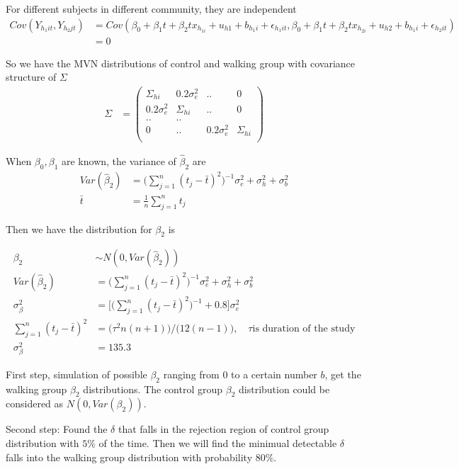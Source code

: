 \begin{itemize}
For different subjects in different community, they are independent
\begin{align*}
Cov(Y_{h_1it}, Y_{h_2jt})  &=Cov( \beta_0 + \beta_1t + \beta_2 t x_{h_{1i}} + u_{h1} + b_{h_1i} + \epsilon_{h_1it},  \beta_0 + \beta_1t + \beta_2 t x_{h_{2i}} + u_{h2} + b_{h_1i} + \epsilon_{h_2it})  \\ 
&=0 
\end{align*}

So we have the MVN distributions of control and walking group with covariance structure of $\Sigma$
\begin{align*}
\Sigma &= \begin{pmatrix} 
\Sigma_{hi} &  0.2 \sigma_e^2 &.. & 0 \\
 0.2 \sigma_e^2 &\Sigma_{hi} &..& 0 \\
..&..\\
 0 &.. & 0.2 \sigma_e^2 &\Sigma_{hi} \\
\end{pmatrix}
\end{align*}

When $\beta_0, \beta_1$ are known, the variance of $\hat{\beta}_2$ are
\begin{align*}
Var(\hat{\beta}_2)&= \big( \sum_{j=1}^n (t_j - \bar{t})^2 \big)^{-1} \sigma_e^2 + \sigma_h^2 + \sigma_b^2 \\
 \bar{t} &= \frac{1}{n} \sum_{j=1}^n t_j
\end{align*}

Then we have the distribution for $\beta_2$ is 

\begin{align*}
\beta_2 & \sim N(0, Var(\hat{\beta}_2)) \\
Var(\hat{\beta}_2)&= \big( \sum_{j=1}^n (t_j - \bar{t})^2 \big)^{-1} \sigma_e^2 + \sigma_h^2 + \sigma_b^2 \\
\sigma_{\beta}^2 &=\big[ \big( \sum_{j=1}^n (t_j - \bar{t})^2 \big)^{-1} + 0.8 \big ] \sigma_e^2  \\
\sum_{j=1}^n (t_j - \bar{t})^2 &= \big(\tau^2 n(n+1) \big)/ \big(12(n-1) \big) , \quad \tau \text{is duration of the study} \\
\sigma_{\beta}^2 &= 135.3
\end{align*}

First step, simulation of possible $\beta_2$ ranging from 0 to a certain number $b$, get the walking group $\beta_2$ distributions.
The control group $\beta_2$ distribution could be considered as $N(0, Var(\beta_2))$. 

Second step: Found the $\delta$ that falls in the rejection region of control group distribution with $5\%$ of the time. Then we will find the minimual detectable $\delta$ falls into the walking group distribution with probability $80\%$. 


\end{itemize}
